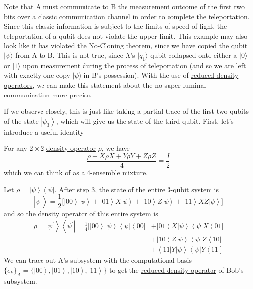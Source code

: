\documentclass{article}
\newcommand{\ket}[1]{\ensuremath{\left|#1\right\rangle}}
\newcommand{\bra}[1]{\ensuremath{\left\langle#1\right|}}
\newcounter{theorem}[section]
\newcounter{example}[section]
\begin{document}
    Note that A must communicate to B the measurement outcome of the first two bits over a classic communication channel in order to complete the teleportation. Since this classic information is subject to the limits of speed of light, the teleportation of a qubit does not violate the upper limit. This example may also look like it has violated the No-Cloning theorem, since we have copied the qubit $|\psi\rangle$ from A to B. This is not true, since A's $|q_1\rangle$ qubit collapsed onto either a $|0\rangle$ or $|1\rangle$ upon measurement during the process of teleportation (and so we are left with exactly one copy $|\psi\rangle$ in B's possession). With the use of \hyperref[def:reduced-density-operator]{reduced density operators}, we can make this statement about the no super-luminal communication more precise. 

    If we observe closely, this is just like taking a partial trace of the first two qubits of the state $\ket{\psi_3}$, which will give us the state of the third qubit. First, let's introduce a useful identity. 

    \begin{lemma}
      \label{thm:depolarizing-lemma}
      For any $2 \times 2$ \hyperref[def:density-operator]{density operator} $\rho$, we have 
      \begin{equation}
        \frac{\rho + X \rho X + Y \rho Y + Z \rho Z}{4} = \frac{I}{2}
      \end{equation}
      which we can think of as a 4-ensemble mixture. 
    \end{lemma}

    Let $\rho = \ket{\psi} \bra{\psi}$. After step 3, the state of the entire 3-qubit system is 
    \begin{equation}
      \ket{\psi^\prime} = \frac{1}{2} \big[ \ket{00} \ket{\psi} + \ket{01} X \ket{\psi} + \ket{10} Z \ket{\psi} + \ket{11} X Z \ket{\psi} \big]
    \end{equation}
    and so the \hyperref[def:density-operator]{density operator} of this entire system is  
    \begin{align}
      \rho = \ket{\psi^\prime} \bra{\psi^\prime} = \frac{1}{4} \Big[ \ket{00} \ket{\psi} \bra{\psi} \bra{00} & + \ket{01} X \ket{\psi} \bra{\psi} X \bra{01} \\ 
      & + \ket{10} Z \ket{\psi} \bra{\psi} Z \bra{10} \\ 
      & + \bra{11} Y \ket{\psi} \bra{\psi} Y \bra{11} \big] 
    \end{align}
    We can trace out A's subsystem with the computational basis $\{e_k\}_A = \{\ket{00} , \ket{01}, \ket{10}, \ket{11}\}$ to get the \hyperref[def:reduced-density-operator]{reduced density operator} of Bob's subsystem. 
\end{document}
